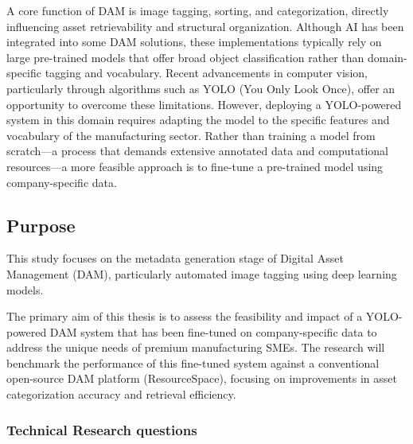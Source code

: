 \documentclass[a4paper,10pt,twocolumn]{article}
\numberwithin{figure}{section}
\numberwithin{table}{section}
\begin{document}
A core function of DAM is image tagging, sorting, and categorization, directly influencing asset 
retrievability and structural organization. Although AI has been integrated into some DAM solutions,
 these implementations typically rely on large pre-trained models that offer broad object classification 
 rather than domain-specific tagging and vocabulary. Recent advancements in computer vision, 
 particularly through algorithms such as YOLO (You Only Look Once), 
offer an opportunity to overcome these limitations. However, deploying a YOLO-powered system in this domain
 requires adapting the model to the specific features and vocabulary of the manufacturing sector. Rather than
  training a model from scratch—a process that demands extensive annotated data and computational resources—a 
  more feasible approach is to fine-tune a pre-trained model using company-specific data. 


\subsection{Purpose}
This study focuses on the metadata generation stage of Digital Asset Management 
(DAM), particularly automated image tagging using deep learning models.

The primary aim of this thesis is to assess the feasibility and impact of a YOLO-powered DAM system 
that has been fine-tuned on company-specific data to address the unique needs of premium manufacturing SMEs. 
The research will benchmark the performance of this fine-tuned system against a conventional open-source DAM 
platform (ResourceSpace), focusing on improvements in asset categorization accuracy
and retrieval efficiency. 

\vspace{0.3cm}
\subsubsection{Technical Research questions}
\vspace{0.3cm}
\end{document}
